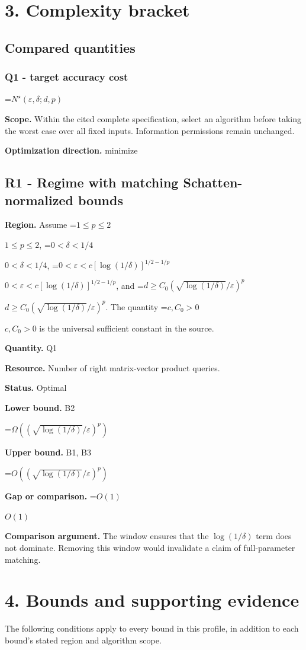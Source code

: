 \documentclass[10pt,a4paper]{article}
\newcommand{\AtlasMath}[1]{\par\begingroup\centering\setbox0=\hbox{$\displaystyle #1$}\ifdim\wd0>1.4\linewidth\typeout{ATLAS WIDE FORMULA: \the\wd0}\fi\ifdim\wd0>\linewidth\resizebox{\linewidth}{!}{\box0}\else\box0\fi\par\endgroup}
\newcommand{\AtlasInlineMath}[1]{\begingroup\setbox0=\hbox{$#1$}\ifdim\wd0>.4\linewidth\endgroup\AtlasMath{#1}\else\endgroup$#1$\fi}
\begin{document}
\section{3. Complexity bracket}
\subsection{Compared quantities}
\subsubsection{Q1 - target accuracy cost}
\AtlasMath{N^\star(\varepsilon,\delta;d,p)}
\textbf{Scope.} Within the cited complete specification, select an algorithm before taking the worst case over all fixed inputs. Information permissions remain unchanged.

\textbf{Optimization direction.} minimize

\subsection{R1 - Regime with matching Schatten-normalized bounds}
\textbf{Region.} Assume \AtlasInlineMath{1\le p\le2}, \AtlasInlineMath{0<\delta<1/4}, \AtlasInlineMath{0<\varepsilon<c[\log(1/\delta)]^{1/2-1/p}}, and \AtlasInlineMath{d\ge C_0(\sqrt{\log(1/\delta)}/\varepsilon)^p}. The quantity \AtlasInlineMath{c,C_0>0} is the universal sufficient constant in the source.

\textbf{Quantity.} Q1

\textbf{Resource.} Number of right matrix-vector product queries.

\textbf{Status.} Optimal

\textbf{Lower bound.} B2

\AtlasMath{\Omega((\sqrt{\log(1/\delta)}/\varepsilon)^p)}
\textbf{Upper bound.} B1, B3

\AtlasMath{O((\sqrt{\log(1/\delta)}/\varepsilon)^p)}
\textbf{Gap or comparison.} \AtlasInlineMath{O(1)}

\textbf{Comparison argument.} The window ensures that the $\log(1/\delta )$ term does not dominate. Removing this window would invalidate a claim of full-parameter matching.

\section{4. Bounds and supporting evidence}
The following conditions apply to every bound in this profile, in addition to each bound's stated region and algorithm scope.
\end{document}
